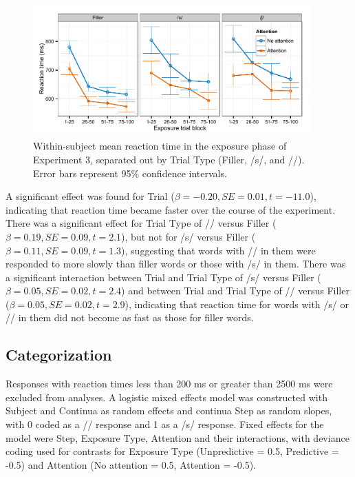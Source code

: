 \begin{figure}[!ht]
\centering
\caption{Within-subject mean reaction time in the exposure phase of Experiment 3, separated out by Trial Type (Filler, /s/, and /\textesh/). Error bars represent 95\% confidence intervals.}
\label{fig:exp3exposert}
\begin{center}
\includegraphics[width=0.95\textwidth]{graphs/exp3_exprt}
\end{center}
\end{figure}

A significant effect was found for Trial ($\beta = -0.20, SE = 0.01, t = -11.0$), indicating that reaction time became faster over the course of the experiment.
There was a significant effect for Trial Type of /\textesh/ versus Filler ($\beta = 0.19, SE = 0.09, t = 2.1$), but not for /s/ versus Filler ($\beta = 0.11, SE = 0.09, t = 1.3$), suggesting that words with /\textesh/ in them were responded to more slowly than filler words or those with /s/ in them.
There was a significant interaction between Trial and Trial Type of  /s/ versus Filler ($\beta = 0.05, SE = 0.02, t = 2.4$) and between Trial and Trial Type of /\textesh/ versus Filler ($\beta = 0.05, SE = 0.02, t = 2.9$), indicating that reaction time for words with /s/ or /\textesh/ in them did not become as fast as those for filler words.


\subsection{Categorization}

Responses with reaction times less than 200 ms or greater than 2500 ms were excluded from analyses. 
A logistic mixed effects model was constructed with Subject and Continua as random effects and continua Step as random slopes, with 0 coded as a /\textesh/ response and 1 as a /s/ response.  Fixed effects for the model were Step, Exposure Type, Attention and their interactions, with deviance coding used for contrasts for Exposure Type (Unpredictive = 0.5, Predictive = -0.5) and Attention (No attention = 0.5, Attention = -0.5).


